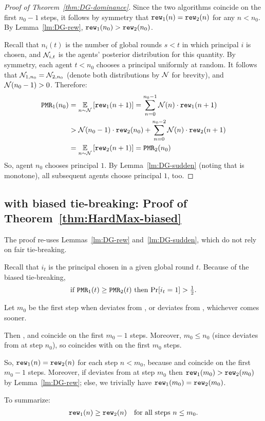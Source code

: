 \begin{proof}[Proof of Theorem~\ref{thm:DG-dominance}]
Since the two algorithms coincide on the first $n_0-1$ steps, it follows by symmetry that $\mathtt{rew}_1(n) = \mathtt{rew}_2(n)$ for any $n< n_0$.
By Lemma~\ref{lm:DG-rew},
    $\mathtt{rew}_1(n_0) > \mathtt{rew}_2(n_0)$.

Recall that $n_i(t)$ is the number of global rounds $s<t$ in which principal $i$ is chosen, and $\mathcal{N}_{i,t}$ is the agents' posterior distribution for this quantity. By symmetry, each agent $t<n_0$ chooses a principal uniformly at random. It follows that
    $\mathcal{N}_{1,n_0} = \mathcal{N}_{2,n_0}$
(denote both distributions by $\mathcal{N}$ for brevity), and $\mathcal{N}(n_0-1)>0$.
Therefore:
\begin{align}
\PMR_1(n_0)
  &= \Ex{n\sim \mN} {\rew_1(n+ 1)}
   = \sum_{n = 0}^{n_0-1} \mN(n) \cdot{\rew_1(n + 1)} \nonumber \\
  & > \mN(n_0-1)\cdot {\rew_2(n_0)} + \sum_{n = 0}^{n_0-2}  \mN(n)\cdot{\rew_2(n + 1)}
    \nonumber \\
  &= \Ex{n\sim \mN}{\rew_2(n + 1)} = \PMR_2(n_0) \label{eq:pf:thm:DG-dominance}
\end{align}
So, agent $n_0$ chooses principal $1$. By Lemma~\ref{lm:DG-sudden} {(noting that \DynGreedy is monotone)}, all subsequent agents choose principal $1$, too.
\end{proof}

\subsection{\HardMax with biased tie-breaking:
Proof of Theorem~\ref{thm:HardMax-biased}}
\label{sec:proofs-HM-main}

The proof re-uses Lemmas~\ref{lm:DG-rew} and~\ref{lm:DG-sudden}, which do not rely on fair tie-breaking.

Recall that $i_t$ is the principal chosen in a given global round $t$.
Because of the biased tie-breaking,
\begin{align}\label{eq:thm:HardMax-biased-PMRtoPr}
\text{if $\mathtt{PMR}_1(t)\geq \mathtt{PMR}_2(t)$ then $\Pr[i_t=1]>\tfrac12$.}
\end{align}

Let $m_0$ be the first step when \alg[2] deviates from \DynGreedy, or \DynGreedy deviates from \StaticGreedy, whichever comes sooner. {Then \alg[2], \DynGreedy and \StaticGreedy coincide on the first $m_0-1$ steps. Moreover, $m_0\leq n_0$ (since \DynGreedy deviates from \StaticGreedy at step $n_0$), so \alg[1] coincides with \DynGreedy on the first $m_0$ steps.

So, $\mathtt{rew}_1(n)=\mathtt{rew}_2(n)$ for each step $n<m_0$, because \alg[1] and \alg[2] coincide on the first $m_0-1$ steps. Moreover, if \alg[2] deviates from \DynGreedy at step $m_0$ then
    $\mathtt{rew}_1(m_0) > \mathtt{rew}_2(m_0)$
by Lemma~\ref{lm:DG-rew}; else, we trivially have
    $\mathtt{rew}_1(m_0) = \mathtt{rew}_2(m_0)$.} To summarize:
\begin{align}\label{eq:thm:HardMax-biased-rew}
    \mathtt{rew}_1(n)\geq\mathtt{rew}_2(n)\quad \text{for all steps $n\leq m_0$}.
\end{align}

